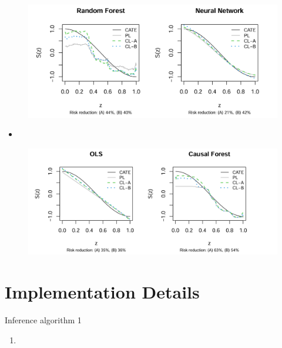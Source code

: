 \documentclass[xcolor=svgnames,aspectratio=169]{beamer}
\begin{document}
\begin{frame}
    \begin{figure}
            \includegraphics[width=1.5\textwidth, height=0.4\textheight, keepaspectratio]{PLvsCL(RF,NN).png}
        \end{figure}
    \begin{itemize}
        \item 
    \end{itemize}
\end{frame}

\begin{frame}
    \begin{figure}
            \includegraphics[width=1.5\textwidth, height=0.4\textheight, keepaspectratio]{PLvsCL(OLS,CF).png}
        \end{figure}
\end{frame}

\section{Implementation Details}

\begin{frame}{Inference algorithm 1}
    \begin{enumerate}
        \item 
    \end{enumerate}
\end{frame}
\end{document}
